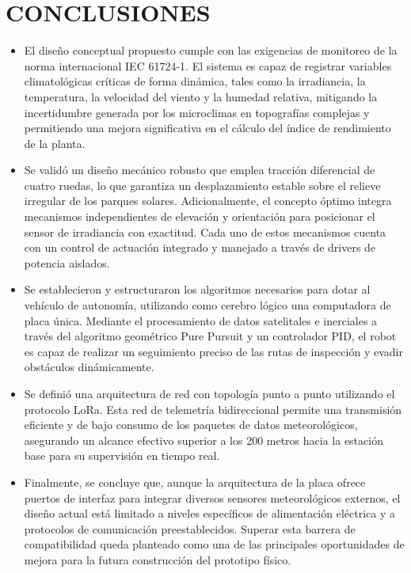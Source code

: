 \renewcommand{\baselinestretch}{1.5}
\chapter*{\centering \large CONCLUSIONES} %

\begin{itemize}
    \item El diseño conceptual propuesto cumple con las exigencias de monitoreo de la norma internacional IEC 61724-1. El sistema es capaz de registrar variables climatológicas críticas de forma dinámica, tales como la irradiancia, la temperatura, la velocidad del viento y la humedad relativa, mitigando la incertidumbre generada por los microclimas en topografías complejas y permitiendo una mejora significativa en el cálculo del índice de rendimiento de la planta.
    
    \item Se validó un diseño mecánico robusto que emplea tracción diferencial de cuatro ruedas, lo que garantiza un desplazamiento estable sobre el relieve irregular de los parques solares. Adicionalmente, el concepto óptimo integra mecanismos independientes de elevación y orientación para posicionar el sensor de irradiancia con exactitud. Cada uno de estos mecanismos cuenta con un control de actuación integrado y manejado a través de drivers de potencia aislados.
    
    \item Se establecieron y estructuraron los algoritmos necesarios para dotar al vehículo de autonomía, utilizando como cerebro lógico una computadora de placa única. Mediante el procesamiento de datos satelitales e inerciales a través del algoritmo geométrico Pure Pursuit y un controlador PID, el robot es capaz de realizar un seguimiento preciso de las rutas de inspección y evadir obstáculos dinámicamente.
    
    \item Se definió una arquitectura de red con topología punto a punto utilizando el protocolo LoRa. Esta red de telemetría bidireccional permite una transmisión eficiente y de bajo consumo de los paquetes de datos meteorológicos, asegurando un alcance efectivo superior a los 200 metros hacia la estación base para su supervisión en tiempo real.
    
    \item Finalmente, se concluye que, aunque la arquitectura de la placa ofrece puertos de interfaz para integrar diversos sensores meteorológicos externos, el diseño actual está limitado a niveles específicos de alimentación eléctrica y a protocolos de comunicación preestablecidos. Superar esta barrera de compatibilidad queda planteado como una de las principales oportunidades de mejora para la futura construcción del prototipo físico.
\end{itemize}


